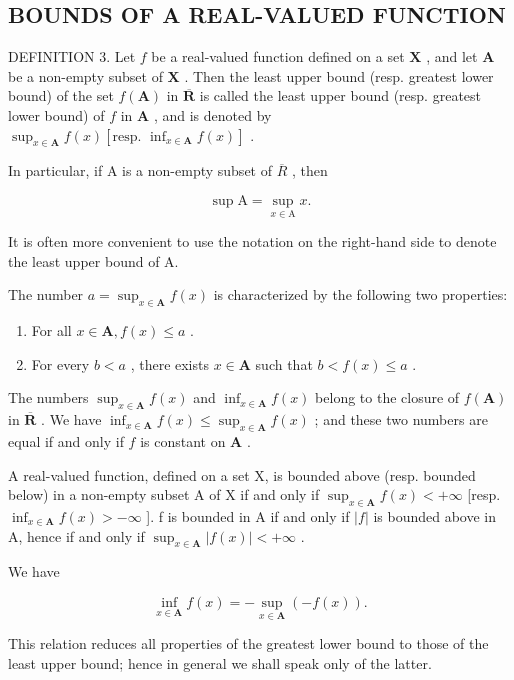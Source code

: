 \subsection{BOUNDS OF A REAL-VALUED FUNCTION}

DEFINITION 3. Let \(f\) be a real-valued function defined on a set \(\mathbf{X}\) , and let \(\mathbf{A}\) be a non-empty subset of \(\mathbf{X}\) . Then the least upper bound (resp. greatest lower bound) of the set \(f(\mathbf{A})\) in \(\overline{\mathbf{R}}\) is called the least upper bound (resp. greatest lower bound) of \(f\) in \(\mathbf{A}\) , and is denoted by \(\sup_{x\in \mathbf{A}}f(x)\left[\text{resp. } \inf_{x\in \mathbf{A}} f(x)\right]\) .

In particular, if A is a non-empty subset of \(\overline{R}\) , then

\[
\sup \mathrm{A} = \sup _ {x \in \mathrm{A}} x.\tag{1}
\]

It is often more convenient to use the notation on the right-hand side to denote the least upper bound of A.

The number \(a = \sup_{x \in \mathbf{A}} f(x)\) is characterized by the following two properties:

\begin{enumerate}
\def\labelenumi{(\roman{enumi})}
\item
  For all \(x \in \mathbf{A}, f(x) \leqslant a\) .
\item
  For every \(b < a\) , there exists \(x \in \mathbf{A}\) such that \(b < f(x) \leqslant a\) .
\end{enumerate}

The numbers \(\sup_{x\in\mathbf{A}}f(x)\) and \(\inf_{x\in\mathbf{A}}f(x)\) belong to the closure of \(f(\mathbf{A})\) in \(\overline{\mathbf{R}}\) . We have \(\inf_{x\in\mathbf{A}}f(x)\leqslant\sup_{x\in\mathbf{A}}f(x)\) ; and these two numbers are equal if and only if \(f\) is constant on \(\mathbf{A}\) .

A real-valued function, defined on a set X, is bounded above (resp. bounded below) in a non-empty subset A of X if and only if \(\sup_{x\in\mathbf{A}}f(x)<+\infty\) {[}resp. \(\inf_{x\in\mathbf{A}}f(x)>-\infty\) {]}. f is bounded in A if and only if \(|f|\) is bounded above in A, hence if and only if \(\sup_{x\in\mathbf{A}}|f(x)|<+\infty\) .

We have

\[
\inf _ {x \in \mathbf {A}} f (x) = - \sup _ {x \in \mathbf {A}} (- f (x)).\tag{2}
\]

This relation reduces all properties of the greatest lower bound to those of the least upper bound; hence in general we shall speak only of the latter.

